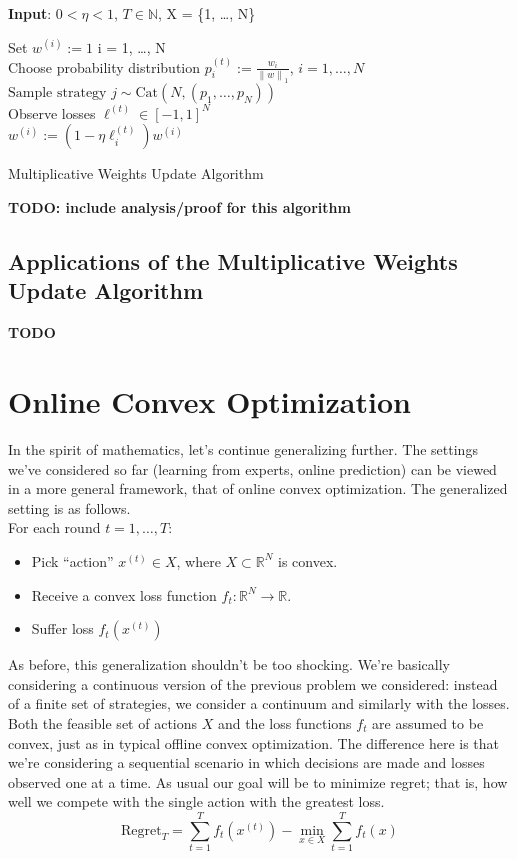 \documentclass[12pt]{article}
\newcommand*{\norm}[1]{\left\lVert#1\right\rVert}
\newcommand{\R}{\mathcal{R}}
\def\R{\mathbb{R}}
\begin{document}
 \begin{algorithm}[H]
	\SetAlgoLined
	
	\textbf{Input}: $0 < \eta < 1$, $T \in \mathbb{N}$,  X = \{1, \dots, N\} \\
	
	\bigskip
	
	Set $w^{(i)} := 1$  i = 1, \dots, N \\
	
	 {
		Choose probability distribution $p^{(t)}_i := \frac{w_i}{\norm{w}_1}$, $i = 1, \dots, N$ \\
		$\text{Sample strategy } j \sim \text{Cat}(N, (p_1, \dots, p_N))$ \\
		Observe losses $\ell^{(t)} \in [-1, 1]^N$ \\
		
		 {
			$w^{(i)} := (1 - \eta \ell_i^{(t)})w^{(i)}$ \\
		}
	}			
\caption{Multiplicative Weights Update Algorithm}
\end{algorithm}

\bigskip

\textbf{TODO: include analysis/proof for this algorithm}

\subsection{Applications of the Multiplicative Weights Update Algorithm}
\textbf{TODO}



\section{Online Convex Optimization}
In the spirit of mathematics, let's continue generalizing further. The settings we've considered so far (learning from experts, online prediction) can be viewed 
in a more general framework, that of online convex optimization. The generalized setting is as follows. \\
For each round $t = 1, \dots, T$:
\begin{itemize}
\item Pick ``action'' $x^{(t)} \in X$, where $X \subset \R^N$ is convex.
\item Receive a convex loss function $f_t: \R^N \to \R$. 
\item Suffer loss $f_t(x^{(t)})$
\end{itemize}
As before, this generalization shouldn't be too shocking. We're basically considering a continuous version of the previous problem we considered: instead of a finite 
set of strategies, we consider a continuum and similarly with the losses. Both the feasible set of actions $X$ and the loss functions $f_t$ are assumed to be convex, just 
as in typical offline convex optimization. The difference here is that we're considering a sequential scenario in which decisions are made and losses observed one at a time. 
As usual our goal will be to minimize regret; that is, how well we compete with the single action with the greatest loss. 
\[\text{Regret}_T = \sum_{t = 1}^{T} f_t(x^{(t)}) - \min_{x \in X} \sum_{t = 1}^{T} f_t(x)\]
\end{document}

